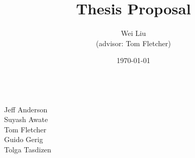 \documentclass[12pt]{article}
\begin{document}
\title{Thesis Proposal}
\author{Wei Liu\\ \small{(advisor: Tom Fletcher)} }
\date{\today} 

\maketitle 
\begin{center}
\\
Jeff Anderson \\
Suyash Awate \\
Tom Fletcher\\
Guido Gerig\\
Tolga Tasdizen
\end{center}

 

\end{document}
